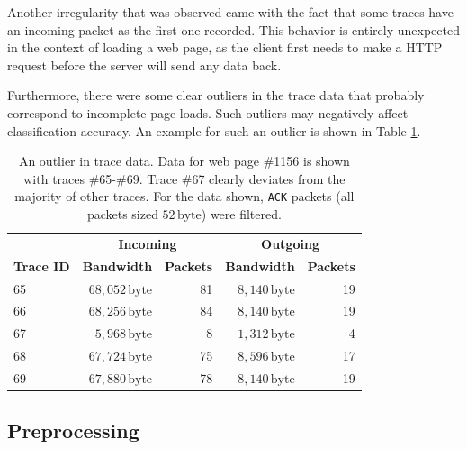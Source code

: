 \documentclass[
	ruledheaders=chapter,
	class=report,
	thesis={type=master, department=inf},
	accentcolor=1c,
	custommargins=true,
	marginpar=false,
	parskip=half-,
	fontsize=11pt,
]{tudapub}
\begin{document}
	Another irregularity that was observed came with the fact that some traces have an incoming packet as the first one recorded. This behavior is entirely unexpected in the context of loading a web page, as the client first needs to make a HTTP request before the server will send any data back.
	
	Furthermore, there were some clear outliers in the trace data that probably correspond to incomplete page loads. Such outliers may negatively affect classification accuracy. An example for such an outlier is shown in Table \ref{tbl:outlier}.
	
	\begin{table}
		\centering
		\begin{tabular}{lrrrr}
			\toprule & \multicolumn{2}{c}{\textbf{Incoming}} & \multicolumn{2}{c}{\textbf{Outgoing}} \\
			\textbf{Trace ID} & \textbf{Bandwidth} & \textbf{Packets} & \textbf{Bandwidth} & \textbf{Packets} \\
			\midrule 65 & $68,052\,\text{byte}$ & 81 & $8,140\,\text{byte}$ & 19 \\
			66 & $68,256\,\text{byte}$ & 84 & $8,140\,\text{byte}$ & 19 \\
			67 & $5,968\,\text{byte}$ & 8 & $1,312\,\text{byte}$ & 4 \\
			68 & $67,724\,\text{byte}$ & 75 & $8,596\,\text{byte}$ & 17 \\
			69 & $67,880\,\text{byte}$ & 78 & $8,140\,\text{byte}$ & 19 \\
			\bottomrule
		\end{tabular}
		\caption[An outlier in trace data]{An outlier in trace data. Data for web page \#1156 is shown with traces \#65-\#69. Trace \#67 clearly deviates from the majority of other traces. For the data shown, \texttt{ACK} packets (all packets sized $52\,\text{byte}$) were filtered.}
		\label{tbl:outlier}
	\end{table}

	\subsection{Preprocessing}
	\label{methods:dataset:pre}
	
\end{document}
